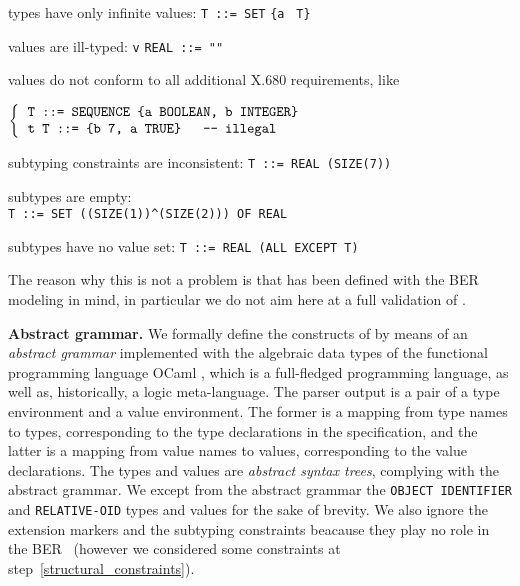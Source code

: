 \begin{enumerate}
  
  \bitem \label{finiteness} types have only infinite values:
  \texttt{\small T ::= SET} \verb+{+\texttt{a} \texttt{\small
  T}\verb+}+

  \bitem \label{typing} values are ill-typed: \texttt{v}
  \texttt{\small REAL ::= ""}

  \bitem values do not conform to all additional \mbox{X.680}
  requirements, like
  \begin{center}
  {\small
    $\left\{
    \begin{tabular}{l}
      \verb+T ::= SEQUENCE {a BOOLEAN, b INTEGER}+\\
      \verb+t T ::= {b 7, a TRUE}   -- illegal+
    \end{tabular}
    \right.$
  }
  \end{center}

  \bitem \label{constraint_consistence} subtyping constraints are
  inconsistent: \texttt{\small T ::= REAL (SIZE(7))}

  \bitem \label{subtype_non_emptiness} subtypes are empty:\\
  {\small \verb+T ::= SET ((SIZE(1))^(SIZE(2))) OF REAL+}
        
  \bitem \label{solvability} subtypes have no value set:
  \texttt{\small T ::= REAL (ALL EXCEPT T)}

\end{enumerate}

The reason why this is not a problem is that \core has been defined
with the BER modeling in mind, in particular we do not aim here at a
full validation of \ASN.

\medskip

\textbf{Abstract grammar.} We formally define the constructs of \core
by means of an \emph{abstract grammar} implemented with the algebraic
data types of the functional programming language OCaml
\cite{ChaillouxManouryPagano:2000}, which is a full-fledged
programming language, as well as, historically, a logic
meta-language. The \core parser output is a pair of a type environment
and a value environment. The former is a mapping from type names to
types, corresponding to the type declarations in the \ASN
specification, and the latter is a mapping from value names to values,
corresponding to the value declarations. The types and values are
\emph{abstract syntax trees}, complying with the abstract grammar. We
except from the abstract grammar the \texttt{\small OBJECT IDENTIFIER}
and \texttt{\small RELATIVE-OID} types and values for the sake of
brevity. We also ignore the extension markers and the subtyping
constraints beacause they play no role in the
BER~\cite[\S{8.1.1.4}]{X.690:2002} (however we considered some
constraints at step~\ref{structural_constraints}).

